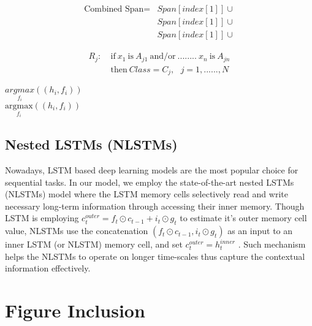 \documentclass[11pt]{article}
\begin{document}
\begin{equation*}
\begin{split}
\mbox{Combined Span} = &Span[index[1]] \cup \\ %
                       &Span[index[1]] \cup \\
                       &Span[index[1]] \cup
\end{split}
\end{equation*}

\begin{equation*}
\begin{split}
R_j: & \ \mbox{if}\ x_1\ \mbox{is}\ A_{j1}\ \mbox{and/or}\ ........\ x_n\ \mbox{is}\ A_{jn} \\
     & \ \mbox{then}\ Class = C_j, \ \ \ j=1, ......,N     
\end{split}
\end{equation*}

$\underset{f_i}{argmax} ((h_i, f_i))$ \\
$\underset{f_i}{\mbox{argmax}} ((h_i, f_i))$

\subsection{Nested LSTMs (NLSTMs)}
\label{ref:nestedLSTMs}
Nowadays, LSTM based deep learning models are the most popular choice for sequential tasks. In our model, we employ the state-of-the-art nested LSTMs (NLSTMs) model where the LSTM memory cells selectively read and write necessary long-term information through accessing their inner memory. Though LSTM is employing $c_t^{outer}={f_{t}}\odot{c_{t-1}+i_t}\odot{g_{t}}$ to estimate it’s outer memory cell value, NLSTMs use the concatenation $(f_t\odot{c_{t-1}},i_t\odot{g_t}) $ as an input to an inner LSTM (or NLSTM) memory cell, and set $c_t^{outer}=h_t^{inner} $ . Such mechanism helps the NLSTMs to operate on longer time-scales thus capture the
contextual information effectively.

\section{Figure Inclusion}
\label{ref:figure}
\end{document}
